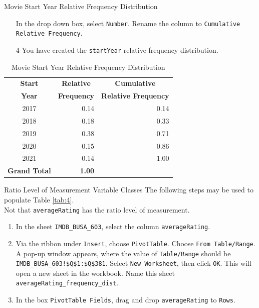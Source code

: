 \documentclass[pdf]{beamer}
\theoremstyle{remark}
\theoremstyle{definition}
\begin{document}
\begin{frame}{Movie Start Year Relative Frequency Distribution}
\begin{enumerate}
  \item[]  In the drop down box, select \texttt{Number}. Rename the column to \texttt{Cumulative Relative Frequency}.
  \item[4] You have created the \texttt{startYear} relative frequency distribution. 
\end{enumerate}
\vspace{1.5ex}
\begin{table}[htbp]
  \centering
  \captionsetup{justification=centering} 
    \begin{tabular}{crr}
    \rowcolor[rgb]{ .851,  .882,  .949} \textbf{Start} & \multicolumn{1}{c}{\textbf{Relative}} & \multicolumn{1}{c}{\textbf{Cumulative}}\\
       \rowcolor[rgb]{ .851,  .882,  .949}  \textbf{Year} & \multicolumn{1}{c}{\textbf{Frequency}} & \multicolumn{1}{c}{\textbf{Relative Frequency}}\\

    \midrule
    2017  & 0.14 &0.14\\
    2018  & 0.18 &0.33\\
    2019  & 0.38 &0.71\\
    2020  & 0.15 &0.86\\
    2021  & 0.14 &1.00\\
    \midrule
    \rowcolor[rgb]{ .851,  .882,  .949} \textbf{Grand Total} & \textbf{1.00} & \\
    \end{tabular}  
  \caption{Movie Start Year Relative Frequency Distribution}  
  \label{tab:syrfd}%
\end{table}%
\end{frame}

\begin{frame}[t]{Ratio Level of Measurement Variable Classes}
The following steps may be used to populate Table \ref{tab:4}.\\  Not that \texttt{averageRating} has the ratio level of measurement. \\  
\vspace{1.5ex}
\begin{enumerate}
\item In the sheet \texttt{IMDB\_BUSA\_603}, select the column \texttt{averageRating}.
\item Via the ribbon under \texttt{Insert}, choose \texttt{PivotTable}.  Choose \texttt{From Table/Range}.  A pop-up window appears, where the value of \texttt{Table/Range} should be \texttt{IMDB\_BUSA\_603!\$Q\$1:\$Q\$381}.  Select \texttt{New Worksheet}, then click \texttt{OK}.  This will open a new sheet in the workbook.  Name this sheet \texttt{averageRating\_frequency\_dist}.
\item In the box \texttt{PivotTable Fields}, drag and drop \texttt{averageRating} to \texttt{Rows}.
\end{enumerate}
\normalsize
\end{frame}
\end{document}
